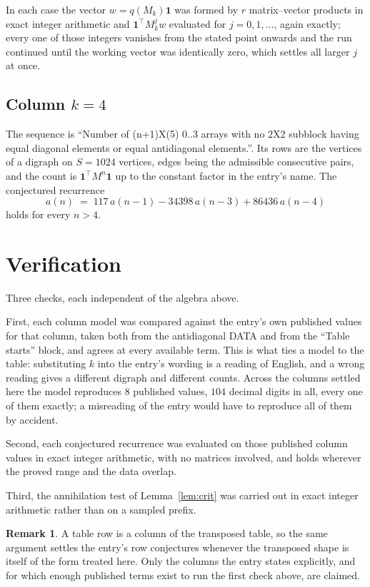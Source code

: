 \documentclass[11pt,a4paper]{article}
\theoremstyle{plain}
\theoremstyle{definition}
\newtheorem{remark}[theorem]{Remark}
\begin{document}
In each case the vector $w=q(M_k)\mathbf{1}$ was formed by $r$ matrix--vector products in
exact integer arithmetic and $\mathbf{1}^{\!\top}M_k^{j}w$ evaluated for $j=0,1,\dots$,
again exactly; every one of those integers vanishes from the stated point onwards and the run
continued until the working vector was identically zero, which settles all larger $j$ at once.

\subsection*{Column $k=4$}
The sequence is ``Number of (n+1)X(5) 0..3 arrays with no 2X2 subblock having equal diagonal elements or equal antidiagonal elements.''. Its rows are the vertices of a digraph on
$S=1024$ vertices, edges being the admissible consecutive pairs, and the count is
$\mathbf{1}^{\!\top}M^{n}\mathbf{1}$ up to the constant factor in the entry's name.
The conjectured recurrence
\[
a(n)\;=\;117\,a(n-1) - 34398\,a(n-3) + 86436\,a(n-4)
\]
holds for every $n>4$.

\section{Verification}

Three checks, each independent of the algebra above.

First, each column model was compared against the entry's own published values for that
column, taken both from the antidiagonal DATA and from the ``Table starts'' block, and agrees
at every available term. This is what ties a model to the table: substituting $k$ into the
entry's wording is a reading of English, and a wrong reading gives a different digraph and
different counts. Across the columns settled here the model reproduces $8$ published
values, $104$ decimal digits in all, every one of them exactly; a misreading of the entry
would have to reproduce all of them by accident.

Second, each conjectured recurrence was evaluated on those published column values in exact
integer arithmetic, with no matrices involved, and holds wherever the proved range and the
data overlap.

Third, the annihilation test of Lemma~\ref{lem:crit} was carried out in exact integer
arithmetic rather than on a sampled prefix.

\begin{remark}
A table row is a column of the transposed table, so the same argument settles the entry's row
conjectures whenever the transposed shape is itself of the form treated here. Only the columns
the entry states explicitly, and for which enough published terms exist to run the first check
above, are claimed.
\end{remark}
\end{document}
